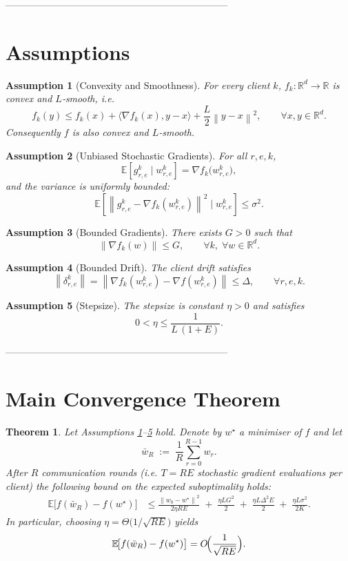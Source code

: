 \documentclass{article}
\newtheorem{theorem}{Theorem}
\newtheorem{assumption}{Assumption}
\newcommand{\EE}{\mathbb{E}}
\newcommand{\RR}{\mathbb{R}}
\newcommand{\norm}[1]{\left\lVert#1\right\rVert}
\newcommand{\inner}[2]{\langle #1,#2\rangle}
\newcommand{\grad}{\nabla}
\begin{document}
---------------------------------------------------------------------

\section*{Assumptions}
\begin{assumption}[Convexity and Smoothness]\label{ass:convex}
For every client $k$, $f_k:\RR^d\to\RR$ is convex and $L$‑smooth, i.e.
\[
    f_k(y)\le f_k(x)+\inner{\grad f_k(x)}{y-x}
    +\frac{L}{2}\norm{y-x}^2,\qquad\forall x,y\in\RR^d .
\]
Consequently $f$ is also convex and $L$‑smooth.
\end{assumption}

\begin{assumption}[Unbiased Stochastic Gradients]\label{ass:unbiased}
For all $r,e,k$,
\[
    \EE\!\left[g_{r,e}^{k}\mid w_{r,e}^{k}\right]
    =\grad f_k\!\bigl(w_{r,e}^{k}\bigr),
\]
and the variance is uniformly bounded:
\[
    \EE\!\left[\norm{g_{r,e}^{k}-\grad f_k(w_{r,e}^{k})}^2\mid w_{r,e}^{k}\right]
    \le\sigma^2 .
\]
\end{assumption}

\begin{assumption}[Bounded Gradients]\label{ass:bounded}
There exists $G>0$ such that
\[
    \norm{\grad f_k(w)}\le G,\qquad\forall k,\; \forall w\in\RR^d .
\]
\end{assumption}

\begin{assumption}[Bounded Drift]\label{ass:drift}
The client drift satisfies
\[
    \norm{\delta_{r,e}^{k}}
    =\norm{\grad f_k(w_{r,e}^{k})-\grad f(w_{r,e}^{k})}
    \le \Delta,\qquad\forall r,e,k .
\]
\end{assumption}

\begin{assumption}[Stepsize]\label{ass:stepsize}
The stepsize is constant $\eta>0$ and satisfies
\[
    0<\eta\le \frac{1}{L\,(1+E)} .
\]
\end{assumption}

---------------------------------------------------------------------

\section*{Main Convergence Theorem}
\begin{theorem}\label{thm:main}
Let Assumptions \ref{ass:convex}–\ref{ass:stepsize} hold.
Denote by $w^\star$ a minimiser of $f$ and let
\[
    \bar w_R \;:=\; \frac1R\sum_{r=0}^{R-1} w_r .
\]
After $R$ communication rounds (i.e. $T=RE$ stochastic gradient evaluations per client)
the following bound on the expected suboptimality holds:
\[
\begin{aligned}
\EE\!\bigl[f(\bar w_R)-f(w^\star)\bigr]
&\le
\frac{\norm{w_0-w^\star}^2}{2\eta RE}
\;+\;
\frac{\eta L G^2}{2}
\;+\;
\frac{\eta L\Delta^2 E}{2}
\;+\;
\frac{\eta L\sigma^2}{2K}. \tag{3}
\end{aligned}
\]
In particular, choosing $\eta = \Theta\!\bigl(1/\sqrt{RE}\bigr)$ yields
\[
    \EE\!\bigl[f(\bar w_R)-f(w^\star)\bigr]=
    O\!\Bigl(\frac{1}{\sqrt{RE}}\Bigr).
\]
\end{theorem}
\end{document}
